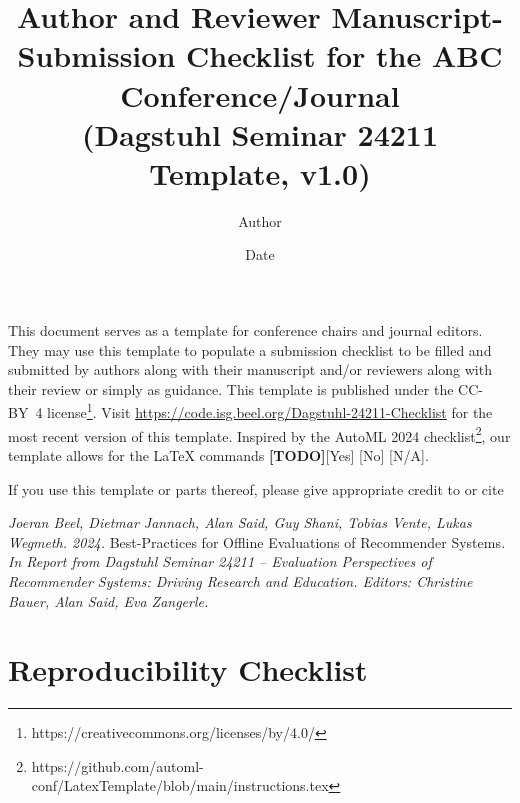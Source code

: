 \documentclass{article}
\title{Author and Reviewer Manuscript-Submission Checklist for the ABC Conference/Journal \\
(Dagstuhl Seminar 24211 Template, v1.0)}
\author{Author}
\date{Date}
\begin{document}

\newcommand{\answerYes}[1]{{\textcolor{answerYesColor}{[Yes]}\xspace#1}}
\newcommand{\answerNo}[1]{{\textcolor{answerNoColor}{[No]}\xspace#1}}
\newcommand{\answerNA}[1]{{\textcolor{answerNAColor}{[N/A]}\xspace#1}}
\newcommand{\answerTODO}{\textcolor{answerTODOColor}{\textbf{[TODO]}}}


\maketitle

\noindent This document serves as a template for conference chairs and journal editors. They may use this template to populate a submission checklist to be filled and submitted by authors along with their manuscript and/or reviewers along with their review or simply as guidance. This template is published under the CC-BY~4 license\footnote{https://creativecommons.org/licenses/by/4.0/}. Visit 
 \href{https://code.isg.beel.org/Dagstuhl-24211-Checklist}{https://code.isg.beel.org/Dagstuhl-24211-Checklist} for the most recent version of this template. Inspired by the AutoML 2024 checklist\footnote{https://github.com/automl-conf/LatexTemplate/blob/main/instructions.tex}, our template allows for the LaTeX commands \answerTODO \answerYes{} \answerNo{} \answerNA{}.

If you use this template or parts thereof, please give appropriate credit to or cite

\begin{displayquote}
\textit{Joeran Beel, Dietmar Jannach, Alan Said, Guy Shani, Tobias Vente, Lukas Wegmeth. 2024. }Best-Practices for Offline Evaluations of Recommender Systems\textit{. In Report from Dagstuhl Seminar 24211 -- Evaluation Perspectives of Recommender Systems: Driving Research and Education. Editors: Christine Bauer, Alan Said, Eva Zangerle.}
\end{displayquote}

\section{Reproducibility Checklist}
\end{document}
